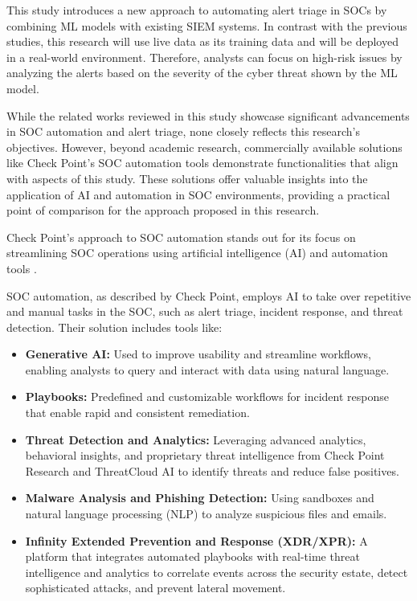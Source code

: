\normalsize

This study introduces a new approach to automating alert triage in SOCs by combining ML models with existing SIEM systems. 
In contrast with the previous studies, this research will use live data as its training data and will be deployed in a real-world environment. 
Therefore, analysts can focus on high-risk issues by analyzing the alerts based on the severity of the cyber threat shown by the ML model.

While the related works reviewed in this study showcase significant advancements in SOC automation and alert triage, none closely reflects this research's objectives. 
However, beyond academic research, commercially available solutions like Check Point's SOC automation tools demonstrate functionalities that align with aspects of this study. 
These solutions offer valuable insights into the application of AI and automation in SOC environments, providing a practical point of comparison for the approach proposed in this research.

Check Point's approach to SOC automation stands out for its focus on streamlining SOC operations using artificial intelligence (AI) and automation tools \parencite{checkpoint}.

SOC automation, as described by Check Point, employs AI to take over repetitive and manual tasks in the SOC, such as alert triage, incident response, and threat detection. Their solution includes tools like:
\begin{itemize}
    \item \textbf{Generative AI:} Used to improve usability and streamline workflows, enabling analysts to query and interact with data using natural language.
    \item \textbf{Playbooks:} Predefined and customizable workflows for incident response that enable rapid and consistent remediation.
    \item \textbf{Threat Detection and Analytics:} Leveraging advanced analytics, behavioral insights, and proprietary threat intelligence from Check Point Research and ThreatCloud AI to identify threats and reduce false positives.
    \item \textbf{Malware Analysis and Phishing Detection:} Using sandboxes and natural language processing (NLP) to analyze suspicious files and emails.
    \item \textbf{Infinity Extended Prevention and Response (XDR/XPR):} A platform that integrates automated playbooks with real-time threat intelligence and analytics to correlate events across the security estate, detect sophisticated attacks, and prevent lateral movement.
\end{itemize}

